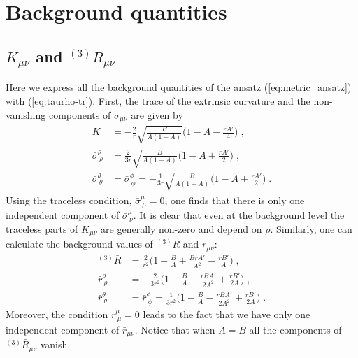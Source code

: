 \documentclass[a4paper,11pt]{article}
\numberwithin{equation}{section}
\begin{document}

\section{Background quantities}

\subsection{$\bar{K}_{\mu\nu}$ and ${}^{(3)}\!\bar{R}_{\mu\nu}$}\label{app:Background quantities}
Here we express all the background quantities of the ansatz (\ref{eq:metric_ansatz}) with (\ref{eq:taurho-tr}). First, the trace of the extrinsic curvature and the non-vanishing components of $\sigma_{\mu\nu}$ are given by
\begin{align}
\bar{K} &= -\frac{2}{r} \sqrt{\frac{B}{A(1 - A)}} \bigg(1 - A - \frac{r A'}{4}\bigg) \;, \\
\bar{\sigma}^\rho_{\ \rho} &= \frac{2}{3 r} \sqrt{\frac{B}{A(1 - A)}} \bigg(1 - A + \frac{r A'}{2} \bigg)  \;, \\
\bar{\sigma}^\theta_{\ \theta} &= \bar{\sigma}^\phi_{\ \phi}=  -\frac{1}{3 r} \sqrt{\frac{B}{A(1 - A)}} \bigg(1 - A + \frac{r A'}{2}\bigg)\;. 
\end{align}
Using the traceless condition, $\bar{\sigma}^\mu_{\ \mu} = 0$, one finds that there is only one independent component of $\bar{\sigma}^\mu_{\ \nu}$. It is clear that even at the background level the traceless parts of $\bar{K}_{\mu\nu}$ are generally non-zero and depend on $\rho$. Similarly, one can calculate the background values of ${}^{(3)}\!R$ and $r_{\mu\nu}$:
\begin{align}
{}^{(3)}\!\bar{R} &= \frac{2}{r^2}\bigg(1 - \frac{B}{A} + \frac{B r A'}{A^2} - \frac{r B'}{A} \bigg)  \;, \\
\bar{r}^\rho_{\ \rho} &= - \frac{2}{3r^2} \bigg(1 - \frac{B}{A} - \frac{r B A'}{2 A^2} + \frac{r B'}{2 A} \bigg) \;, \\ 
\bar{r}^\theta_{\ \theta} &= \bar{r}^\phi_{\ \phi} = \frac{1}{3r^2} \bigg(1 - \frac{B}{A} - \frac{r B A'}{2 A^2} + \frac{r B'}{2 A} \bigg) \;.
\end{align}
Moreover, the condition $\bar{r}^\mu_{\ \mu} = 0$ leads to the fact that we have only one independent component of $\bar{r}_{\mu\nu}$. Notice that when $A = B$ all the components of ${}^{(3)}\!\bar{R}_{\mu\nu}$ vanish. 
\end{document}
